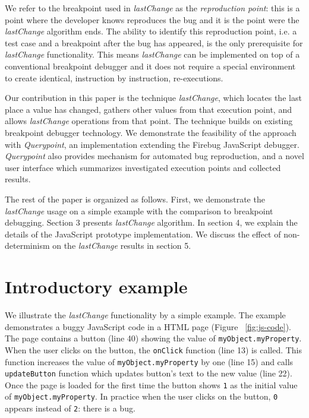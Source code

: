 \documentclass[runningheads,a4paper]{llncs}
\begin{document}
We refer to the breakpoint used in \textit{lastChange} as the
\textit{reproduction point}: this is a point where the developer knows
reproduces the bug and it is the point were the \textit{lastChange}
algorithm ends. The ability to identify this reproduction point, i.e.
 a test case and a breakpoint after the bug has appeared, is the only
prerequisite for \textit{lastChange} functionality.  This means
\textit{lastChange} can be implemented on top of a conventional
breakpoint debugger and it does not require a special environment to
create identical, instruction by instruction, re-executions.

Our contribution in this paper is the technique \textit{lastChange},
which locates the last place a value has changed, gathers other values
from that execution point, and allows \textit{lastChange} operations
from that point. The technique builds on existing breakpoint debugger
technology. We demonstrate the feasibility of the approach with
\textit{Querypoint}, an implementation extending the Firebug
JavaScript debugger. \textit{Querypoint} also provides mechanism for
automated bug reproduction, and a novel user interface which
summarizes investigated execution points and collected results.

The rest of the paper is organized as follows. First, we demonstrate
the \textit{lastChange} usage on a simple example with the comparison
to breakpoint debugging. Section 3 presents \textit{lastChange}
algorithm. In section 4, we explain the details of the JavaScript
prototype implementation. We discuss the effect of non-determinism on
the \textit{lastChange} results in section 5.  %

\section{Introductory example}
\label{sec:introExample}

We illustrate the \textit{lastChange} functionality by a simple
example. The example demonstrates a buggy JavaScript code in a HTML
page (Figure ~\ref{fig:js-code}). The page contains a button (line 40)
showing the value of \texttt{myObject.myProperty}.  When the user
clicks on the button, the \texttt{onClick} function (line 13) is
called. This function increases the value of
\texttt{myObject.myProperty} by one (line 15) and calls
\texttt{updateButton} function which updates button's text to the new
value (line 22).  Once the page is loaded for the first time the
button shows \texttt{1} as the initial value of
\texttt{myObject.myProperty}.  In practice when the user clicks on the
button, \texttt{0} appears instead of \texttt{2}: there is a bug.
\end{document}
